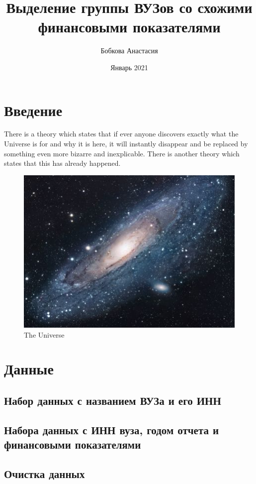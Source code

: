 \documentclass{article}
\title{Выделение группы ВУЗов со схожими финансовыми показателями}
\author{Бобкова Анастасия}
\date{Январь 2021}
\begin{document}
\maketitle

\newpage
\tableofcontents

\newpage
\section{Введение}
There is a theory which states that if ever anyone discovers exactly what the Universe is for and why it is here, it will instantly disappear and be replaced by something even more bizarre and inexplicable.
There is another theory which states that this has already happened.

\begin{figure}[h!]
\centering
\includegraphics[scale=1.7]{universe}
\caption{The Universe}
\label{fig:universe}
\end{figure}

\section{Данные}
\subsection{Набор данных с названием ВУЗа и его ИНН}
\subsection{Набора данных с ИНН вуза, годом отчета и финансовыми показателями}
\subsection{Очистка данных}
\end{document}
